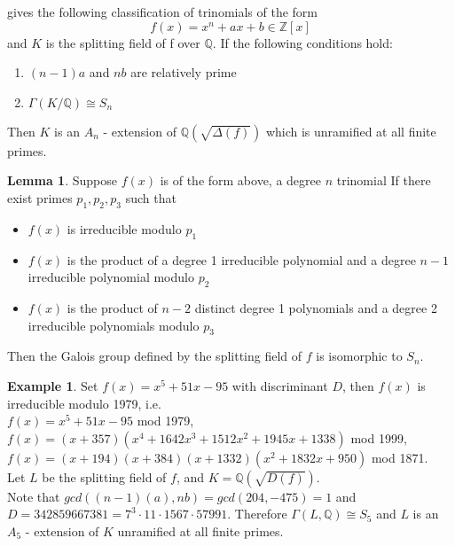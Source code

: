 \documentclass[12pt]{extarticle}
\newcommand{\Q}{\mathbb{Q}}
\newcommand{\Z}{\mathbb{Z}}
\newcommand{\<}{\langle}
\renewcommand{\>}{\rangle}
\theoremstyle{definition}
\newtheorem*{example}{Example}
\newtheorem{lemma}{Lemma}
\begin{document}
\cite{YAMA1970} gives the following classification of trinomials of the form 
\begin{equation}
    f(x) = x^n+ax+b \in \Z[x]
\end{equation}and $K$ is the splitting field of f over $\Q$.
If the following conditions hold:
\begin{enumerate}
    \item $(n-1)a$ and $nb$ are relatively prime 
    \item $\Gamma(K/\Q) \cong S_n$
\end{enumerate}\par
Then $K$ is an $A_n$ - extension of $\Q\left( \sqrt{\Delta(f)}\right)$ which is unramified at all finite primes.
\begin{lemma}
Suppose $f(x)$ is of the form above, a degree $n$ trinomial If there exist primes $p_1, p_2, p_3$ such that \begin{itemize}
\item $f(x)$ is irreducible modulo $p_1$
\item $f(x)$ is the product of a degree 1 irreducible polynomial and a degree $n-1$ irreducible polynomial modulo $p_2$
\item $f(x)$ is the product of $n-2$ distinct degree 1 polynomials and a degree 2 irreducible polynomials modulo $p_3$
\end{itemize}
Then the Galois group defined by the splitting field of $f$ is isomorphic to $S_n$.
\end{lemma}
\begin{example}
Set $f(x)= x^5+51x-95$ with discriminant $D$, then $f(x)$ is irreducible modulo 1979, i.e. \\$f(x)= x^5+51x-95 $ mod 1979, \\
$f(x)=(x + 357)(x^4 + 1642x^3 + 1512 x^2 + 1945x + 1338)$ mod 1999, \\ $f(x)=(
x + 194)(x + 384)(x + 1332)(x^2 + 1832x + 950)$ mod 1871. \\ Let $L$ be the splitting field of $f$, and $K = \Q(\sqrt{D(f)})$. \\
Note that $gcd((n-1)(a),nb) = gcd(204,-475)=1$ and $D = 342859667381 = 7^3 \cdot 11 \cdot 1567 \cdot 57991$. Therefore $\Gamma(L,\Q) \cong S_5$ and $L$ is an $A_5$ - extension of $K$ unramified at all finite primes.
\end{example}

\end{document}
